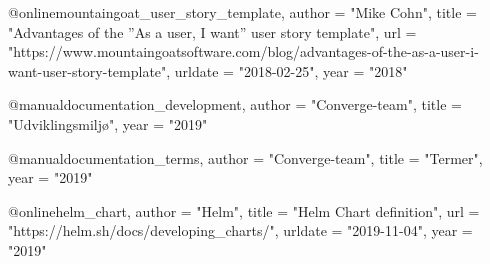 
@online{mountaingoat_user_story_template,
    author = "Mike Cohn",
    title = "{Advantages of the ''As a user, I want'' user story template}",
    url = "https://www.mountaingoatsoftware.com/blog/advantages-of-the-as-a-user-i-want-user-story-template",
	urldate = "2018-02-25",
	year = "2018"
}

@manual{documentation_development,
    author = "Converge-team",
    title = "{Udviklingsmiljø}",
	year = "2019"
}

@manual{documentation_terms,
    author = "Converge-team",
    title = "{Termer}",
	year = "2019"
}

@online{helm_chart,
    author = "Helm",
    title = "{Helm Chart definition}",
    url = "https://helm.sh/docs/developing_charts/",
	urldate = "2019-11-04",
	year = "2019"
}

